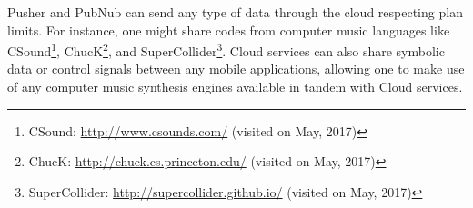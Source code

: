 Pusher and PubNub can send any type of data through the cloud respecting plan limits.
For instance, one might share codes from computer music languages like CSound\footnote{CSound: \url{http://www.csounds.com/} (visited on May, 2017)}, ChucK\footnote{ChucK: \url{http://chuck.cs.princeton.edu/} (visited on May, 2017)}, and SuperCollider\footnote{SuperCollider: \url{http://supercollider.github.io/} (visited on May, 2017)}.
Cloud services can also share symbolic data or control signals between any mobile applications, allowing one to make use of any computer music synthesis engines available in tandem with Cloud services.
